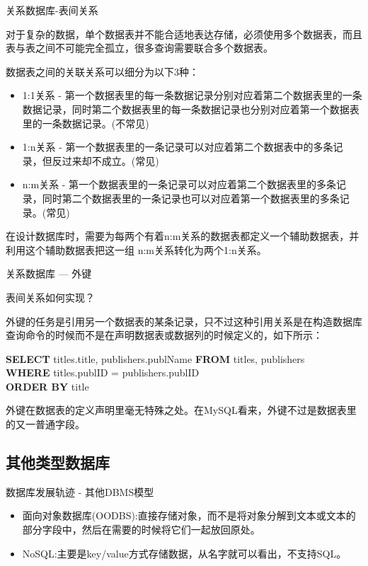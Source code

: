 \documentclass[CJK]{beamer}
\begin{document}
\begin{CJK*}{UTF8}{gbsn}
\begin{frame}{关系数据库-表间关系}
\begin{block}{}
{\tiny 对于复杂的数据，单个数据表并不能合适地表达存储，必须使用多个数据表，而且表与表之间不可能完全孤立，很多查询需要联合多个数据表。}
\end{block}
{\tiny
数据表之间的关联关系可以细分为以下3种：
\begin{itemize}
	\item 1:1关系 - 第一个数据表里的每一条数据记录分别对应着第二个数据表里的一条数据记录，同时第二个数据表里的每一条数据记录也分别对应着第一个数据表里的一条数据记录。({\color{red}不常见})
	\item 1:n关系 - 第一个数据表里的一条记录可以对应着第二个数据表中的多条记录，但反过来却不成立。({\color{red}常见})
	\item n:m关系 - 第一个数据表里的一条记录可以对应着第二个数据表里的多条记录，同时第二个数据表里的一条记录也可以对应着第一个数据表里的多条记录。({\color{red}常见})
\end{itemize}
}
\begin{block}{}
{\tiny 在设计数据库时，需要为每两个有着n:m关系的数据表都定义一个辅助数据表，并利用这个辅助数据表把这一组 n:m关系转化为两个1:n关系。}
\end{block}
\end{frame}
\begin{frame}{关系数据库 --- 外键}
	\begin{block}{}
	{\color{red}表间关系如何实现？}
	\end{block}
外键的任务是引用另一个数据表的某条记录，只不过这种引用关系是在构造数据库查询命令的时候而不是在声明数据表或数据列的时候定义的，如下所示：
\begin{block}{}
{\bf SELECT} titles.title, publishers.publName {\bf FROM} titles, publishers\\
{\bf WHERE} titles.publID = publishers.publID\\
{\bf ORDER BY} title
\end{block}
外键在数据表的定义声明里毫无特殊之处。在MySQL看来，外键不过是数据表里的又一普通字段。
\end{frame}

\subsection{其他类型数据库}
\begin{frame}{数据库发展轨迹 - 其他DBMS模型}
	\begin{itemize}
		\item 面向对象数据库(OODBS):直接存储对象，而不是将对象分解到文本或文本的部分字段中，然后在需要的时候将它们一起放回原处。
		\item NoSQL:主要是key/value方式存储数据，从名字就可以看出，不支持SQL。
	\end{itemize}
\end{frame}

\end{CJK*}
\end{document}
